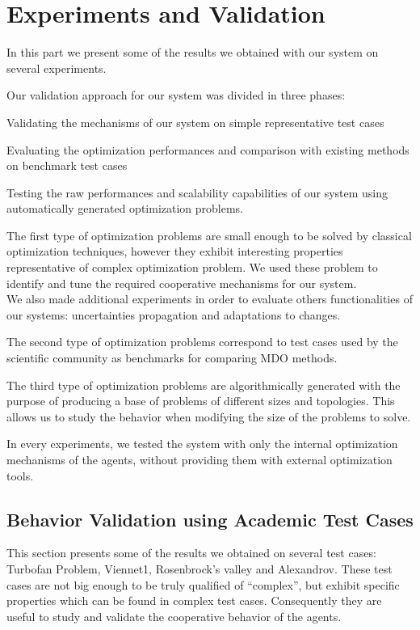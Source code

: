 \part{Experiments and Validation}

In this part we present some of the results we obtained with our system on several experiments.

Our validation approach for our system was divided in three phases:
\begin{compactitem}
\item Validating the mechanisms of our system on simple representative test cases
\item Evaluating the optimization performances and comparison with existing methods on benchmark test cases
\item Testing the raw performances and scalability capabilities of our system using automatically generated optimization problems.
\end{compactitem}

The first type of optimization problems are small enough to be solved by classical optimization techniques, however they exhibit interesting properties representative of complex optimization problem. We used these problem to identify and tune the required cooperative mechanisms for our system.\\
We also made additional experiments in order to evaluate others functionalities of our systems: uncertainties propagation and adaptations to changes.

The second type of optimization problems correspond to test cases used by the scientific community as benchmarks for comparing MDO methods.

The third type of optimization problems are algorithmically generated with the purpose of producing a base of problems of different sizes and topologies. This allows us to study the behavior when modifying the size of the problems to solve.

In every experiments, we tested the system with only the internal optimization mechanisms of the agents, without providing them with external optimization tools.

\chapter{Behavior Validation using Academic Test Cases}

This section presents some of the results we obtained on several test cases: Turbofan Problem, Viennet1, Rosenbrock's valley and Alexandrov. These test cases are not big enough to be truly qualified of \enquote{complex}, but exhibit specific properties which can be found in complex test cases. Consequently they are useful to study and validate the cooperative behavior of the agents.

